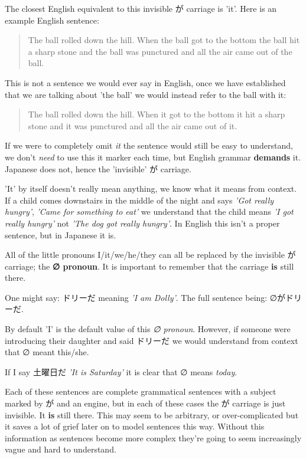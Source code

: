 \documentclass[11pt]{article}
\begin{document}
The closest English equivalent to this invisible が carriage is 'it'. Here is an example English sentence:
\begin{quote}
The ball rolled down the hill. When the ball got to the bottom the ball hit a sharp stone and the ball was punctured and all the air came out of the ball.
\end{quote}

This is not a sentence we would ever say in English, once we have established that we are talking about 'the ball' we would instead refer to the ball with it:
\begin{quote}
The ball rolled down the hill. When it got to the bottom it hit a sharp stone and it was punctured and all the air came out of it.
\end{quote}

If we were to completely omit \emph{it} the sentence would still be easy to understand, we don't \emph{need} to use this it marker each time, but English grammar \textbf{demands} it. Japanese does not, hence the 'invisible' が carriage.

'It' by itself doesn't really mean anything, we know what it means from context. If a child comes downstairs in the middle of the night and says \emph{'Got really hungry'}, \emph{'Came for something to eat'} we understand that the child means \emph{'I got really hungry'} not \emph{'The dog got really hungry'}. In English this isn't a proper sentence, but in Japanese it is.

All of the little pronouns I/it/we/he/they can all be replaced by the invisible が carriage; the \textbf{∅ pronoun}. It is important to remember that the carriage \textbf{is} still there.

One might say: ドリーだ meaning \emph{'I am Dolly'}. The full sentence being: ∅がドリーだ.

By default 'I' is the default value of this \emph{∅ pronoun}. However, if someone were introducing their daughter and said ドリーだ we would understand from context that ∅ meant this/she.

If I say 土曜日だ \emph{'It is Saturday'} it is clear that ∅ means \emph{today}.

Each of these sentences are complete grammatical sentences with a subject marked by が and an engine, but in each of these cases the が carriage is just invisible. It \textbf{is} still there. This may seem to be arbitrary, or over-complicated but it saves a lot of grief later on to model sentences this way. Without this information as sentences become more complex they're going to seem increasingly vague and hard to understand.
\end{document}
